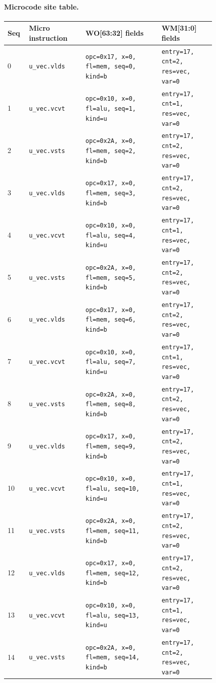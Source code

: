 \paragraph{Microcode site table.}
{\scriptsize
\begin{longtable}{@{}R{0.055\linewidth}L{0.23\linewidth}L{0.31\linewidth}L{0.22\linewidth}@{}}
\toprule
Seq & Micro instruction & WO[63:32] fields & WM[31:0] fields \\
 & \texttt{u\_vec.vlds} & \texttt{opc=0x17, x=0, fl=mem, seq=0, kind=b} & \texttt{entry=17, cnt=2, res=vec, var=0} \\
1 & \texttt{u\_vec.vcvt} & \texttt{opc=0x10, x=0, fl=alu, seq=1, kind=u} & \texttt{entry=17, cnt=1, res=vec, var=0} \\
2 & \texttt{u\_vec.vsts} & \texttt{opc=0x2A, x=0, fl=mem, seq=2, kind=b} & \texttt{entry=17, cnt=2, res=vec, var=0} \\
3 & \texttt{u\_vec.vlds} & \texttt{opc=0x17, x=0, fl=mem, seq=3, kind=b} & \texttt{entry=17, cnt=2, res=vec, var=0} \\
4 & \texttt{u\_vec.vcvt} & \texttt{opc=0x10, x=0, fl=alu, seq=4, kind=u} & \texttt{entry=17, cnt=1, res=vec, var=0} \\
5 & \texttt{u\_vec.vsts} & \texttt{opc=0x2A, x=0, fl=mem, seq=5, kind=b} & \texttt{entry=17, cnt=2, res=vec, var=0} \\
6 & \texttt{u\_vec.vlds} & \texttt{opc=0x17, x=0, fl=mem, seq=6, kind=b} & \texttt{entry=17, cnt=2, res=vec, var=0} \\
7 & \texttt{u\_vec.vcvt} & \texttt{opc=0x10, x=0, fl=alu, seq=7, kind=u} & \texttt{entry=17, cnt=1, res=vec, var=0} \\
8 & \texttt{u\_vec.vsts} & \texttt{opc=0x2A, x=0, fl=mem, seq=8, kind=b} & \texttt{entry=17, cnt=2, res=vec, var=0} \\
9 & \texttt{u\_vec.vlds} & \texttt{opc=0x17, x=0, fl=mem, seq=9, kind=b} & \texttt{entry=17, cnt=2, res=vec, var=0} \\
10 & \texttt{u\_vec.vcvt} & \texttt{opc=0x10, x=0, fl=alu, seq=10, kind=u} & \texttt{entry=17, cnt=1, res=vec, var=0} \\
11 & \texttt{u\_vec.vsts} & \texttt{opc=0x2A, x=0, fl=mem, seq=11, kind=b} & \texttt{entry=17, cnt=2, res=vec, var=0} \\
12 & \texttt{u\_vec.vlds} & \texttt{opc=0x17, x=0, fl=mem, seq=12, kind=b} & \texttt{entry=17, cnt=2, res=vec, var=0} \\
13 & \texttt{u\_vec.vcvt} & \texttt{opc=0x10, x=0, fl=alu, seq=13, kind=u} & \texttt{entry=17, cnt=1, res=vec, var=0} \\
14 & \texttt{u\_vec.vsts} & \texttt{opc=0x2A, x=0, fl=mem, seq=14, kind=b} & \texttt{entry=17, cnt=2, res=vec, var=0} \\
\bottomrule
\end{longtable}
}
